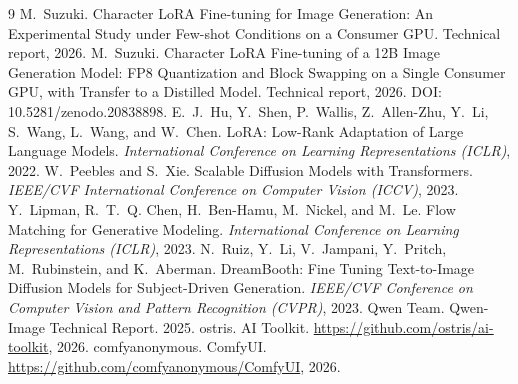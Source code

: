 \documentclass[10pt,twocolumn]{article}
\begin{document}
\begin{thebibliography}{9}
 M.~Suzuki. Character LoRA Fine-tuning for Image Generation: An Experimental Study under Few-shot Conditions on a Consumer GPU. Technical report, 2026.
 M.~Suzuki. Character LoRA Fine-tuning of a 12B Image Generation Model: FP8 Quantization and Block Swapping on a Single Consumer GPU, with Transfer to a Distilled Model. Technical report, 2026. DOI: 10.5281/zenodo.20838898.
 E.~J.~Hu, Y.~Shen, P.~Wallis, Z.~Allen-Zhu, Y.~Li, S.~Wang, L.~Wang, and W.~Chen. LoRA: Low-Rank Adaptation of Large Language Models. \textit{International Conference on Learning Representations (ICLR)}, 2022.
 W.~Peebles and S.~Xie. Scalable Diffusion Models with Transformers. \textit{IEEE/CVF International Conference on Computer Vision (ICCV)}, 2023.
 Y.~Lipman, R.~T.~Q. Chen, H.~Ben-Hamu, M.~Nickel, and M.~Le. Flow Matching for Generative Modeling. \textit{International Conference on Learning Representations (ICLR)}, 2023.
 N.~Ruiz, Y.~Li, V.~Jampani, Y.~Pritch, M.~Rubinstein, and K.~Aberman. DreamBooth: Fine Tuning Text-to-Image Diffusion Models for Subject-Driven Generation. \textit{IEEE/CVF Conference on Computer Vision and Pattern Recognition (CVPR)}, 2023.
 Qwen Team. Qwen-Image Technical Report. 2025.
 ostris. AI Toolkit. \url{https://github.com/ostris/ai-toolkit}, 2026.
 comfyanonymous. ComfyUI. \url{https://github.com/comfyanonymous/ComfyUI}, 2026.
\end{thebibliography}
\end{document}
